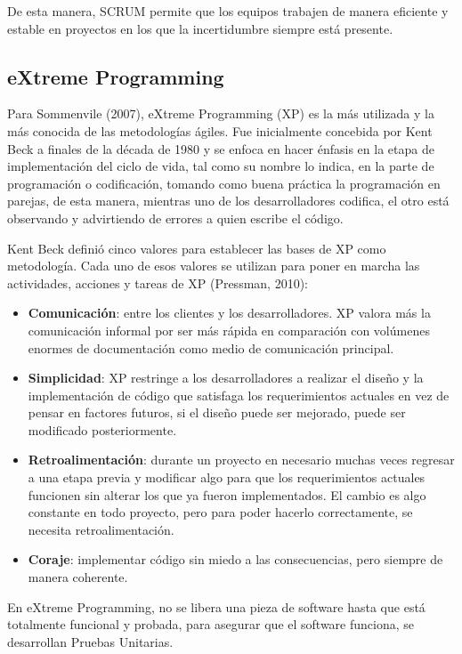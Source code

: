 De esta manera, SCRUM permite que los equipos trabajen de manera eficiente y estable en proyectos en los que la incertidumbre siempre está presente.

\subsection{eXtreme Programming}

Para Sommenvile (2007), eXtreme Programming (XP) es la más utilizada y la más conocida de las metodologías ágiles. Fue inicialmente concebida por Kent Beck a finales de la década de 1980 y se enfoca en hacer énfasis en la etapa de implementación del ciclo de vida, tal como su nombre lo indica, en la parte de programación o codificación, tomando como buena práctica la programación en parejas, de esta manera, mientras uno de los desarrolladores codifica, el otro está observando y advirtiendo de errores a quien escribe el código.

Kent Beck definió cinco valores para establecer las bases de XP como metodología. Cada uno de esos valores se utilizan para poner en marcha las actividades, acciones y tareas de XP (Pressman, 2010):

\begin{itemize}
\item \textbf{Comunicación}: entre los clientes y los desarrolladores. XP valora más la comunicación informal por ser más rápida en comparación con volúmenes enormes de documentación como medio de comunicación principal.
\item \textbf{Simplicidad}: XP restringe a los desarrolladores a realizar el diseño y la implementación de código que satisfaga los requerimientos actuales en vez de pensar en factores futuros, si el diseño puede ser mejorado, puede ser modificado posteriormente.
\item \textbf{Retroalimentación}: durante un proyecto en necesario muchas veces regresar a una etapa previa y modificar algo para que los requerimientos actuales funcionen sin alterar los que ya fueron implementados. El cambio es algo constante en todo proyecto, pero para poder hacerlo correctamente, se necesita retroalimentación.
\item \textbf{Coraje}: implementar código sin miedo a las consecuencias, pero siempre de manera coherente.
\end{itemize}

En eXtreme Programming, no se libera una pieza de software hasta que está totalmente funcional y probada, para asegurar que el software funciona, se desarrollan Pruebas Unitarias. 

